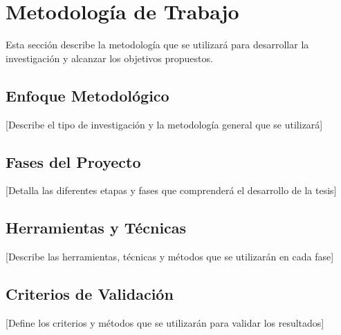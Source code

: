 \section{Metodología de Trabajo}

Esta sección describe la metodología que se utilizará para desarrollar la investigación y alcanzar los objetivos propuestos.

\subsection{Enfoque Metodológico}
[Describe el tipo de investigación y la metodología general que se utilizará]

\subsection{Fases del Proyecto}
[Detalla las diferentes etapas y fases que comprenderá el desarrollo de la tesis]

\subsection{Herramientas y Técnicas}
[Describe las herramientas, técnicas y métodos que se utilizarán en cada fase]

\subsection{Criterios de Validación}
[Define los criterios y métodos que se utilizarán para validar los resultados]